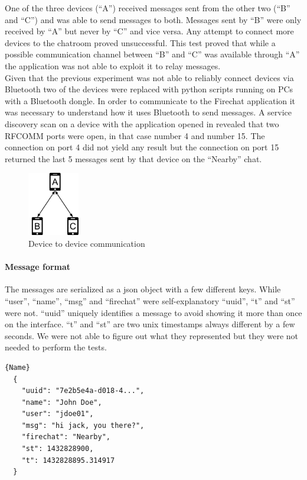 One of the three devices (``A'') received messages sent from the other two (``B'' and ``C'') and was able to send messages to both.
Messages sent by ``B'' were only received by ``A'' but never by ``C'' and vice versa.
Any attempt to connect more devices to the chatroom proved unsuccessful.
This test proved that while a possible communication channel between ``B'' and ``C'' was available through ``A'' the application was not able to exploit it to relay messages.\\

Given that the previous experiment was not able to reliably connect devices via Bluetooth two of the devices were replaced with python scripts running on PCs with a Bluetooth dongle.
In order to communicate to the Firechat application it was necessary to understand how it uses Bluetooth to send messages.
A service discovery scan on a device with the application opened in revealed that two RFCOMM ports were open, in that case number 4 and number 15.
The connection on port 4 did not yield any result but the connection on port 15 returned the last 5 messages sent by that device on the ``Nearby'' chat.

\begin{figure}[ht!]
  \centering
  \includegraphics[width=0.2\textwidth]{img/diagram1.png} 
  \caption{Device to device communication}
\end{figure}

\paragraph{Message format}
The messages are serialized as a json object with a few different keys.
While ``user'', ``name'', ``msg'' and ``firechat'' were self-explanatory ``uuid'', ``t'' and ``st'' were not.
``uuid'' uniquely identifies a message to avoid showing it more than once on the interface.
``t'' and ``st'' are two unix timestamps always different by a few seconds.
We were not able to figure out what they represented but they were not needed to perform the tests. 


\begin{minipage}{\textwidth}
  \begin{lstlisting}[caption=Sample Message,frame=tlrb]{Name}
  {
    "uuid": "7e2b5e4a-d018-4...",
    "name": "John Doe",
    "user": "jdoe01",
    "msg": "hi jack, you there?",
    "firechat": "Nearby",
    "st": 1432828900,
    "t": 1432828895.314917
  }
\end{lstlisting}
\end{minipage}

